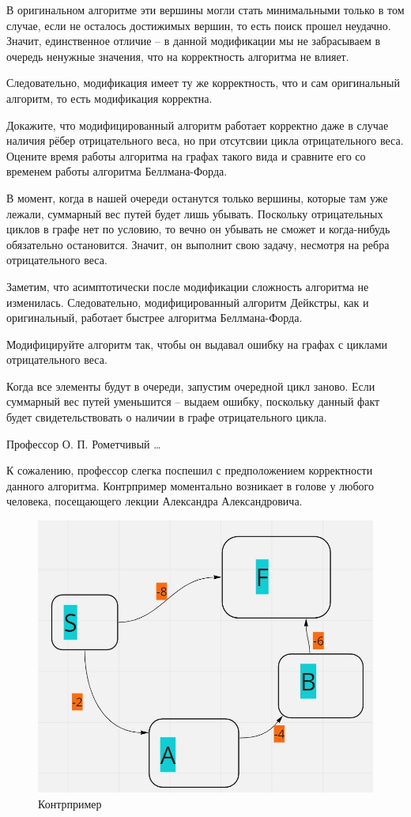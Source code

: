 \documentclass[12pt]{extreport}
\theoremstyle{definiton}
\theoremstyle{definition}
\theoremstyle{definition}
\newcounter{problem}
\newcounter{subproblem}
\def\beforPRskip{
	\bigskip
}
\def\PRSUBskip{
	\medskip
}
\def\pr{\beforPRskip\noindent\stepcounter{problem}{\bf \theproblem .\;}\setcounter{subproblem}{0}}
\def\prsub{\PRSUBskip\noindent\stepcounter{subproblem}{\sf \thesubproblem .} }
\begin{document}
	В оригинальном алгоритме эти вершины могли стать минимальными только в том случае, если не осталось достижимых вершин, то есть поиск прошел неудачно. Значит, единственное отличие -- в данной модификации мы не забрасываем в очередь ненужные значения, что на корректность алгоритма не влияет.

	Следовательно, модификация имеет ту же корректность, что и сам оригинальный алгоритм, то есть модификация корректна.

\prsub Докажите, что модифицированный алгоритм работает корректно даже в случае наличия рёбер отрицательного веса, но при отсутсвии цикла отрицательного веса. Оцените время работы алгоритма на графах такого вида и сравните его со временем работы алгоритма Беллмана-Форда.

	В момент, когда в нашей очереди останутся только вершины, которые там уже лежали, суммарный вес путей будет лишь убывать. Поскольку отрицательных циклов в графе нет по условию,
	то вечно он убывать не сможет и когда-нибудь обязательно остановится. Значит, он выполнит свою задачу, несмотря на ребра отрицательного веса.

	Заметим, что асимптотически после модификации сложность алгоритма не изменилась. Следовательно, модифицированный алгоритм Дейкстры, как и оригинальный, работает быстрее алгоритма Беллмана-Форда.

\prsub Модифицируйте алгоритм так, чтобы он выдавал ошибку на графах с циклами отрицательного веса.

	Когда все элементы будут в очереди, запустим очередной цикл заново. Если суммарный вес путей уменьшится -- выдаем ошибку, поскольку данный факт будет свидетельствовать о наличии в графе отрицательного цикла.

\pr Профессор О. П. Рометчивый \ldots

	К сожалению, профессор слегка поспешил с предположением корректности данного алгоритма. Контрпример моментально возникает в голове у любого человека, посещающего лекции Александра Александровича.

\begin{figure}
	\centering
	\includegraphics[scale=0.6]{1}
	\caption{Контрпример}
\end{figure}
\end{document}
